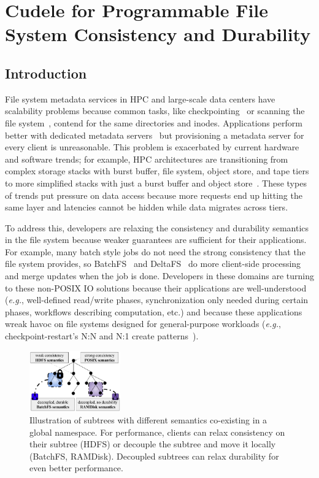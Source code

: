 \chapter{Cudele for Programmable File System Consistency and Durability}
\section{Introduction}

File system metadata services in HPC and large-scale data centers have
scalability problems because common tasks, like
checkpointing~\cite{bent_plfs_2009} or scanning the file
system~\cite{zheng:pdsw2014-batchfs}, contend for the same directories and
inodes. Applications perform better with dedicated metadata
servers~\cite{sevilla:sc15-mantle, ren:sc2014-indexfs} but provisioning a
metadata server for every client is unreasonable. This problem is exacerbated
by current hardware and software trends; for example, HPC architectures are
transitioning from complex storage stacks with burst buffer, file system,
object store, and tape tiers to more simplified stacks with just a burst buffer
and object store~\cite{bent:login16-hpc-trends}. These types of trends put
pressure on data access because more requests end up hitting the same layer and
latencies cannot be hidden while data migrates across tiers.

To address this, developers are relaxing the consistency and durability
semantics in the file system because weaker guarantees are sufficient for their
applications. For example, many batch style jobs do not need the strong
consistency that the file system provides, so
BatchFS~\cite{zheng:pdsw2014-batchfs} and DeltaFS~\cite{zheng:pdsw2015-deltafs}
do more client-side processing and merge updates when the job is done.
Developers in these domains are turning to these non-POSIX IO solutions because
their applications are well-understood ({\it e.g.}, well-defined read/write
phases, synchronization only needed during certain phases, workflows describing
computation, etc.) and because these applications wreak havoc on file systems
designed for general-purpose workloads ({\it e.g.}, checkpoint-restart's N:N
and N:1 create patterns~\cite{bent_plfs_2009}).

\begin{figure}[tb] \centering
\includegraphics[width=0.35\textwidth]{./chapters/cudele/figures/subtree-policies1.png}
\caption{Illustration of subtrees with different semantics co-existing in a
global namespace.  For performance, clients can relax consistency on their
subtree (HDFS) or decouple the subtree and move it locally (BatchFS, RAMDisk).
Decoupled subtrees can relax durability for even better performance.
}\label{fig:subtree-policies} \end{figure}

